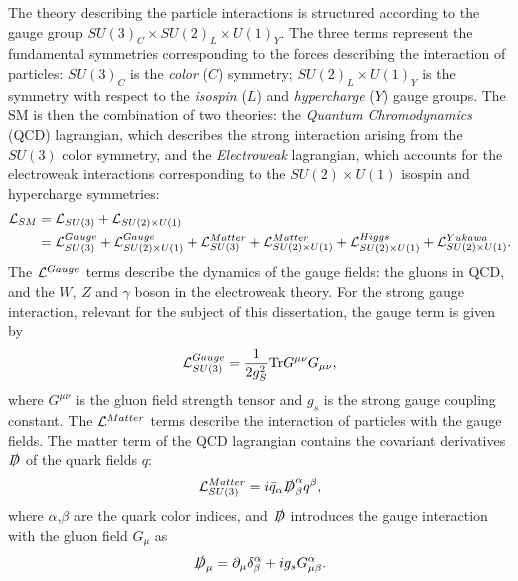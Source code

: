 The theory describing the particle interactions is structured
according to the gauge group $SU(3)_C\times{}SU(2)_L\times{}U(1)_Y$. The three
terms represent the fundamental symmetries corresponding to the forces describing the
interaction of particles: $SU(3)_C$ is the {\it color} ($C$) symmetry;
$SU(2)_L\times{}U(1)_Y$ is the symmetry with respect to the {\it
  isospin} ($L$) and {\it hypercharge} ($Y$) gauge groups.
The SM is then the combination of two theories: the {\it Quantum
  Chromodynamics} (QCD) lagrangian, which describes the strong
interaction arising from the $SU(3)$ color symmetry, and the {\it
  Electroweak} lagrangian, which accounts for the electroweak
interactions corresponding to the $SU(2)\times{}U(1)$ isospin and
hypercharge symmetries:
\begin{equation}
\begin{split}
\mathcal{L}{}_{SM}  & = \mathcal{L}{}_{SU(3)} + \mathcal{L}{}_{SU(2)\times{}U(1)} \\
& = \mathcal{L}{}_{SU(3)}^{Gauge} 
+ \mathcal{L}{}_{SU(2)\times{}U(1)}^{Gauge} 
+ \mathcal{L}{}_{SU(3)}^{Matter}
+ \mathcal{L}{}_{SU(2)\times{}U(1)}^{Matter}
+ \mathcal{L}{}_{SU(2)\times{}U(1)}^{Higgs} +
\mathcal{L}{}_{SU(2)\times{}U(1)}^{Yukawa}. \\
\end{split}
\end{equation}
The $\mathcal{L}{}^{Gauge}$ terms describe the dynamics of the gauge fields:
the gluons in QCD, and the $W$, $Z$ and $\gamma$ boson in the
electroweak theory.
For the strong gauge interaction, relevant for the subject of this
dissertation, the gauge term is given by
\begin{equation}
\mathcal{L}{}_{SU(3)}^{Gauge} = \frac{1}{2g_S^2}\mathrm{Tr}G^{\mu\nu}G_{\mu\nu},
\end{equation}
where $G^{\mu\nu}$ is the gluon field strength tensor and $g_s$ is the
strong gauge coupling constant.
The $\mathcal{L}{}^{Matter}$ terms describe the interaction of particles
with the gauge fields. The matter term of the QCD lagrangian contains
the covariant derivatives $\slashed{D}$ of the quark fields $q$:
\begin{equation}
\mathcal{L}{}_{SU(3)}^{Matter}=i\bar{q}_\alpha \slashed{D}^\alpha_\beta
q^\beta ,
\end{equation}
where $\alpha$,$\beta$ are the quark color indices, and $\slashed{D}$
introduces the gauge interaction with the gluon field $G_\mu$ as
\begin{equation}
\slashed{D}_\mu = \partial_\mu \delta^\alpha_\beta + ig_sG_{\mu
  \beta}^\alpha .
\end{equation}
